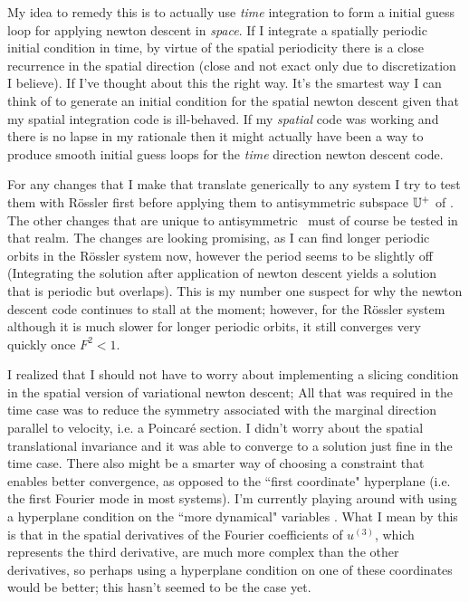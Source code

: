 My idea to remedy this is to actually use \emph{time} integration to form a
initial guess loop for applying {newton descent} in \emph{space}. If I integrate a spatially
periodic initial condition in time, by virtue of the spatial periodicity there is a
close recurrence in the spatial direction (close and not exact only due to discretization I believe).
If I've thought about this the right way. It's the smartest way I can think of to
generate an initial condition for the spatial {newton descent}  given
that my spatial integration code is ill-behaved. If my \emph{spatial} code was
working and there is no lapse in my rationale then it might actually have been
a way to produce smooth initial guess loops for the \emph{time} direction {newton descent} code.

For any changes that I make that translate generically to
any system I try to test them with R\"ossler first before applying them
to antisymmetric subspace $\mathbb{U}^+$ of \KS. The other changes that are
unique to antisymmetric \KS\ must of course be tested in that realm. The
changes are looking promising, as I can find longer periodic orbits in
the R\"ossler system now, however the period seems to be slightly off
(Integrating the solution after application of {newton descent} yields a
solution that is periodic but overlaps). This is my number one suspect
for why the {newton descent} code continues to stall at the moment; however,
for the R\"ossler system although it is much slower for longer periodic
orbits, it still converges very quickly once $F^2 < 1$.

I realized that I should not have to worry about implementing a slicing condition
in the spatial version of variational {newton descent}; All that was required in the
time case was to reduce the symmetry associated with the marginal direction parallel to
velocity, i.e. a Poincar\'e section. I didn't worry about the spatial translational invariance
and it was able to converge to a solution just fine in the time case.
There also might be a smarter way of choosing a constraint that enables better
convergence, as opposed to the ``first coordinate" hyperplane (i.e. the first
Fourier mode in most systems). I'm currently playing around with using a
hyperplane condition on the ``more dynamical" variables . What I mean by this is that in
 the spatial derivatives of the Fourier coefficients of
$u^{(3)}$, which represents the third derivative, are much more complex than
the other derivatives, so perhaps using a hyperplane condition on one of these
coordinates would be better; this hasn't seemed to be the case yet.

